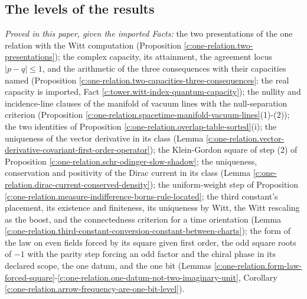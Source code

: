 \documentclass[11pt]{article}
\theoremstyle{definition}
\theoremstyle{plain}
\begin{document}
\subsection*{The levels of the results}
\label{c:note.one-relation.setting-levels-results}
\emph{Proved in this paper, given the imported Facts:} the two presentations of the one relation with the Witt computation (Proposition \ref{c:one-relation.two-presentations}); the complex capacity, its attainment, the agreement locus $|p - q| \leq 1$, and the arithmetic of the three consequences with their capacities named (Proposition \ref{c:one-relation.two-capacities-three-consequences}; the real capacity is imported, Fact \ref{c:tower.witt-index-quantum-capacity}); the nullity and incidence-line clauses of the manifold of vacuum lines with the null-separation criterion (Proposition \ref{c:one-relation.spacetime-manifold-vacuum-lines}(1)-(2)); the two identities of Proposition \ref{c:one-relation.overlap-table-sorted}(i); the uniqueness of the vector derivative in its class (Lemma \ref{c:one-relation.vector-derivative-covariant-first-order-operator}); the Klein-Gordon square of step (2) of Proposition \ref{c:one-relation.schr-odinger-slow-shadow}; the uniqueness, conservation and positivity of the Dirac current in its class (Lemma \ref{c:one-relation.dirac-current-conserved-density}); the uniform-weight step of Proposition \ref{c:one-relation.measure-indifference-borns-rule-located}; the third constant's placement, its existence and finiteness, its uniqueness by Witt, the Witt rescaling as the boost, and the connectedness criterion for a time orientation (Lemma \ref{c:one-relation.third-constant-conversion-constant-between-charts}); the form of the law on even fields forced by its square given first order, the odd square roots of $-1$ with the parity step forcing an odd factor and the chiral phase in its declared scope, the one datum, and the one bit (Lemmas \ref{c:one-relation.form-law-forced-square}-\ref{c:one-relation.one-datum-not-two-imaginary-unit}, Corollary \ref{c:one-relation.arrow-frequency-are-one-bit-level}).
\end{document}
